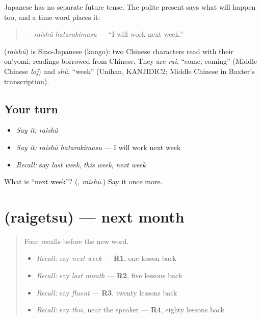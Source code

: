 Japanese has no separate future tense. The polite present \textbf{} says what will happen too, and a time word places it:

\begin{quote}
\textbf{ } — \emph{raishū hatarakimasu} — \textquotedblleft{}I will work next week.\textquotedblright{}
\end{quote}

\begin{cousinweb}
\textbf{} (\emph{raishū}) is Sino-Japanese (kango): two Chinese characters read with their on'yomi, readings borrowed from Chinese. They are \emph{rai}, \textquotedblleft{}come, coming\textquotedblright{} (Middle Chinese \emph{loj}) and \emph{shū}, \textquotedblleft{}week\textquotedblright{} (Unihan, KANJIDIC2; Middle Chinese in Baxter's transcription).
\end{cousinweb}

\subsection*{Your turn}
\begin{itemize}
\raggedright
  \item \emph{Say it:} \emph{raishū}
  \item \emph{Say it:} \emph{raishū hatarakimasu} — I will work next week
  \item \emph{Recall:} say \emph{last week}, \emph{this week}, \emph{next week}
\end{itemize}

\begin{tcolorbox}[breakable,colback=teal!4,colframe=teal!35!black,title={Before you move on}]
What is \textquotedblleft{}next week\textquotedblright{}? (\textbf{}, \emph{raishū}.) Say it once more.
\end{tcolorbox}
\section[\texorpdfstring{\ja{らいげつ} (raigetsu)}{らいげつ (raigetsu)}]{ (raigetsu) — next month}

\label{lesson:JA-C141-raigetsu}



\begin{quote}
Four recalls before the new word.

\begin{itemize}
\raggedright
  \item \emph{Recall:} say \emph{next week} — \textbf{R1}, one lesson back
  \item \emph{Recall:} say \emph{last month} — \textbf{R2}, five lessons back
  \item \emph{Recall:} say \emph{fluent} — \textbf{R3}, twenty lessons back
  \item \emph{Recall:} say \emph{this}, near the speaker — \textbf{R4}, eighty lessons back
\end{itemize}
\end{quote}

